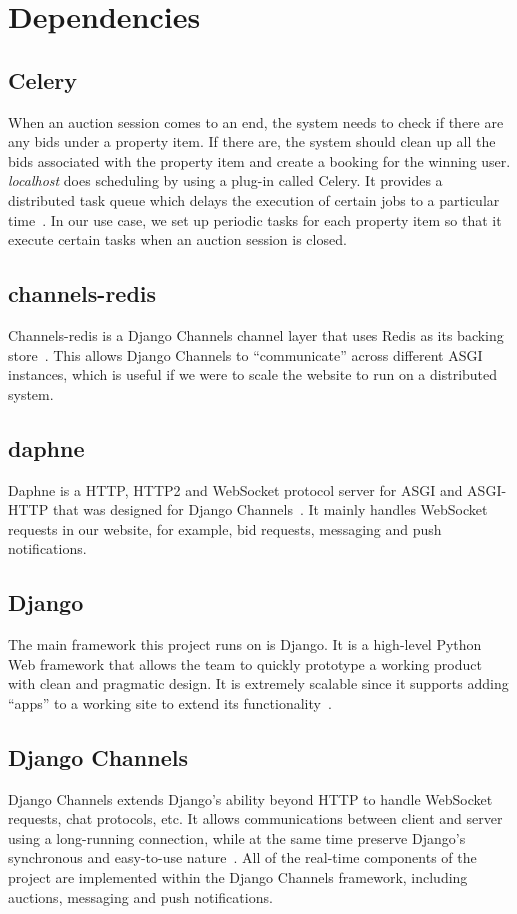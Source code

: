 \section{Dependencies}

\subsection{Celery}
When an auction session comes to an end, the system needs to check if there are
any bids under a property item. If there are, the system should clean up all the
bids associated with the property item and create a booking for the winning user.
\emph{localhost} does scheduling by using a plug-in called Celery. It
provides a distributed task queue which delays the execution of certain jobs to
a particular time~\parencite{celery-doc}. In our use case, we set up periodic
tasks for each property
item so that it execute certain tasks when an auction session is closed.

\subsection{channels-redis}
Channels-redis is a Django Channels channel layer that uses Redis as its backing
store~\parencite{channels-redis-doc}. This allows Django Channels to ``communicate''
across different ASGI instances, which is useful if we were to scale the
website to run on a distributed system.

\subsection{daphne}
Daphne is a HTTP, HTTP2 and WebSocket protocol server for ASGI and ASGI-HTTP
that was designed for Django Channels~\parencite{daphne}. It mainly handles WebSocket requests in
our website, for example, bid requests, messaging and push notifications.

\subsection{Django}
The main framework this project runs on is Django. It is a high-level Python Web
framework that allows the team to quickly prototype a working product with clean
and pragmatic design. It is extremely scalable since it supports adding ``apps''
to a working site to extend its functionality~\parencite{django}. %

\subsection{Django Channels}
Django Channels extends Django's ability beyond HTTP to handle WebSocket
requests, chat protocols, etc. It allows communications between client and
server using a long-running connection, while at the same time preserve Django's
synchronous and easy-to-use nature~\parencite{django-channels-doc}. All of the
real-time components of the project are implemented within the Django Channels
framework, including auctions, messaging and push notifications.

